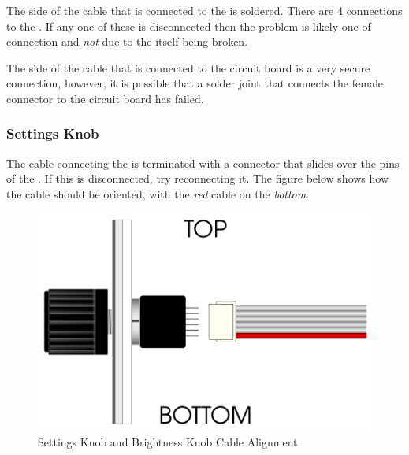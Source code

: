  

\par\bigskip

The side of the cable that is connected to the  is soldered.  There
are \num{4} connections to the .  If any one of these is disconnected
then the problem is likely one of connection and \textit{not} due to the
 itself being broken.

\par\medskip

The side of the cable that is connected to the circuit board is a very secure
connection, however, it is possible that a solder joint that connects the
female connector to the circuit board has failed.

\subsubsection{Settings Knob} \label{Errors - Settings Knob}

 

\par\bigskip

The cable connecting the  is terminated with a connector that slides
over the pins of the .  If this is disconnected, try reconnecting it.
The figure below shows how the cable should be oriented, with the
\textit{red} cable on the \textit{bottom}.

\begin{figure}[H]
\centering
  \includegraphics{images/rotary_encoder.png}
\caption{Settings Knob and Brightness Knob Cable Alignment} \label{fig:Encoder Cable}
\end{figure}

